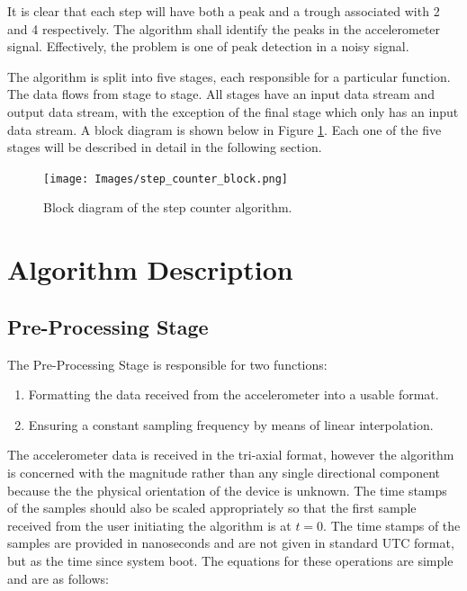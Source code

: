         It is clear that each step will have both a peak and a trough associated with 2 and 4 respectively. The algorithm shall identify the peaks in the accelerometer signal. Effectively, the problem is one of peak detection in a noisy signal. 

        The algorithm is split into five stages, each responsible for a particular function. The data flows from stage to stage. All stages have an input data stream and output data stream, with the exception of the final stage which only has an input data stream. A block diagram is shown below in Figure \ref{img_sc_block}. Each one of the five stages will be described in detail in the following section.

        \begin{figure}[h]
            \texttt{[image: Images/step\_counter\_block.png]}
            \centering
            \caption{Block diagram of the step counter algorithm.}
            \label{img_sc_block}
        \end{figure}

    \chapter{Algorithm Description}

        \section{Pre-Processing Stage}

            The Pre-Processing Stage is responsible for two functions:

            \begin{enumerate}
                \item Formatting the data received from the accelerometer into a usable format.
                \item Ensuring a constant sampling frequency by means of linear interpolation.
            \end{enumerate}

            The accelerometer data is received in the tri-axial format, however the algorithm is concerned with the magnitude rather than any single directional component because the the physical orientation of the device is unknown. The time stamps of the samples should also be scaled appropriately so that the first sample received from the user initiating the algorithm is at $t = 0$. The time stamps of the samples are provided in nanoseconds and are not given in standard UTC format, but as the time since system boot. The equations for these operations are simple and are as follows:

